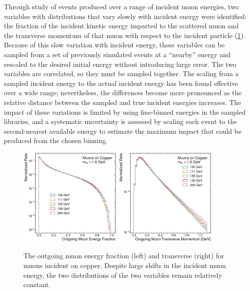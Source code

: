 Through study of \mg events produced over a range of incident muon energies, two variables with distributions that vary slowly with incident energy were identified: the fraction of the incident kinetic energy imparted to the scattered muon and the transverse momentum of that muon with respect to the incident particle (\cref{fig:efrac_pt}). 
Because of this slow variation with incident energy, these variables can be sampled from a set of previously simulated \mg events at a ``nearby'' energy and rescaled to the desired initial energy without introducing large error. 
The two variables are correlated, so they must be sampled together. 
The scaling from a sampled \mg incident energy to the actual \gf incident energy has been found effective over a wide range; nevertheless, the differences become more pronounced as the relative distance between the sampled and true incident energies increases.
The impact of these variations is limited by using fine-binned energies in the sampled \mg libraries, and a systematic uncertainty is assessed by scaling each event to the second-nearest available energy to estimate the maximum impact that could be produced from the chosen binning. 

\begin{figure}[!htbp]
    \centering
    \includegraphics[width=0.45\textwidth]{figures/muon_energy_comp_efrac.pdf}
    \hspace{0.01\textwidth}
    \includegraphics[width=0.45\textwidth]{figures/muon_energy_comp_pt.pdf}
    \caption[
        Sampling variables used for \dbrem simulation.
    ]{
        The outgoing muon energy fraction (left) and transverse (right) for muons incident on copper. Despite large shifts in the incident muon energy, the two distributions of the two variables remain relatively constant. 
    }
    \label{fig:efrac_pt}
\end{figure}

